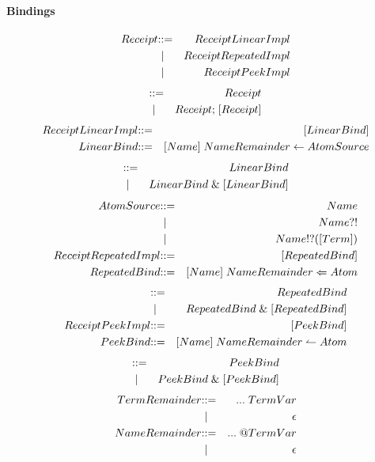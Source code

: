 \paragraph{Bindings}
\begin{eqnarray*}
  Receipt & \mathbin{\mathbf{::=}} & ReceiptLinearImpl \\
  & \;\mathbin{\mathbf\mid} \; & ReceiptRepeatedImpl \\
  & \;\mathbin{\mathbf\mid} \; & ReceiptPeekImpl
\end{eqnarray*}
\begin{eqnarray*}
  [Receipt] & \bc & Receipt \\
  & \;\bm \; & Receipt \mathsf{;}\; [Receipt]
\end{eqnarray*}
\begin{eqnarray*}
  ReceiptLinearImpl & \mathbin{\mathbf{::=}} & [LinearBind] \\
  LinearBind & \mathbin{\mathbf{::=}} & [Name] \; NameRemainder \; \mathsf{\leftarrow} \; AtomSource
\end{eqnarray*}
\begin{eqnarray*}
  [LinearBind] & \bc & LinearBind \\
  & \;\bm \; & LinearBind \;\mathsf{\&}\; [LinearBind]
\end{eqnarray*}
\begin{eqnarray*}
  AtomSource & \mathbin{\mathbf{::=}} & Name \\
  & \;\mathbin{\mathbf\mid} \; & Name \mathsf{?!} \\
  & \;\mathbin{\mathbf\mid} \; & Name \mathsf{!?} \mathsf{(} [Term] \mathsf{)} \\
  ReceiptRepeatedImpl & \mathbin{\mathbf{::=}} & [RepeatedBind] \\
  RepeatedBind & \mathbin{\mathbf{::=}} & [Name] \; NameRemainder \; \mathsf{\Leftarrow} \; Atom
\end{eqnarray*}
\begin{eqnarray*}
  [RepeatedBind] & \bc & RepeatedBind \\
  & \;\bm \; & RepeatedBind \; \mathsf{\&}\; [RepeatedBind] \\
  ReceiptPeekImpl & \bc & [PeekBind] \\
  PeekBind & \bc & [Name] \; NameRemainder \; \mathsf{\leftharpoonup}\; Atom
\end{eqnarray*}
\begin{eqnarray*}
  [PeekBind] & \bc & PeekBind \\
  & \;\bm \; & PeekBind \; \mathsf{\&}\; [PeekBind]
\end{eqnarray*}
\begin{eqnarray*}
  TermRemainder & \mathbin{\mathbf{::=}} & \mathsf{...} \; TermVar \\
 & \;\mathbin{\mathbf\mid} \; & \epsilon \\
  NameRemainder & \mathbin{\mathbf{::=}} & \mathsf{...} \; \mathsf{@} TermVar \\
& \;\mathbin{\mathbf\mid} \; & \epsilon
\end{eqnarray*}

